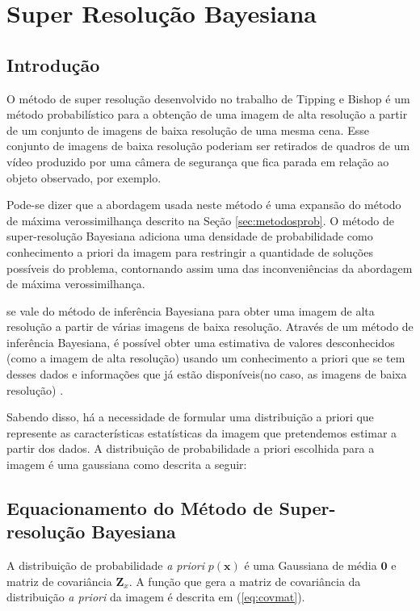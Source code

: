 \chapter{Super Resolução Bayesiana}
\label{chap:srbayes}
\section{Introdução}
O método de super resolução desenvolvido no trabalho de Tipping e Bishop \cite{tipping2003bayesian} é um método probabilístico para a obtenção de uma imagem de alta resolução
a partir de um conjunto de imagens de baixa resolução de uma mesma cena.
Esse conjunto de imagens de baixa resolução poderiam ser retirados de quadros de um
vídeo produzido por uma câmera de segurança que fica parada em relação ao objeto
observado, por exemplo.

Pode-se dizer que a abordagem usada neste método é uma expansão do método de máxima
verossimilhança descrito na Seção \ref{sec:metodosprob}.
O método de super-resolução Bayesiana adiciona uma densidade de probabilidade como
conhecimento a priori da imagem para restringir a quantidade de soluções possíveis do
problema, contornando assim uma das inconveniências da abordagem de máxima verossimilhança.

se vale do método de inferência Bayesiana para obter uma imagem de alta resolução a partir de várias imagens de baixa resolução.
Através de um método de inferência Bayesiana, é possível obter uma estimativa de valores desconhecidos (como a imagem de alta resolução) usando um conhecimento a priori que se tem desses dados e informações que já estão disponíveis(no caso, as imagens de baixa resolução) \cite{therrien2011probability}.

Sabendo disso, há a necessidade de formular uma distribuição a priori que represente as características estatísticas da imagem que pretendemos estimar a partir dos dados.
A distribuição de probabilidade a priori escolhida para a imagem é uma gaussiana como descrita a seguir:

\section{Equacionamento do Método de Super-resolução Bayesiana}
A distribuição de probabilidade \emph{a priori} $p(\mathbf{x})$ é uma Gaussiana de média $\mathbf{0}$ e matriz de covariância $\mathbf{Z}_x$. A função que gera a matriz de covariância da distribuição \emph{a priori} da imagem é descrita em (\ref{eq:covmat}).

